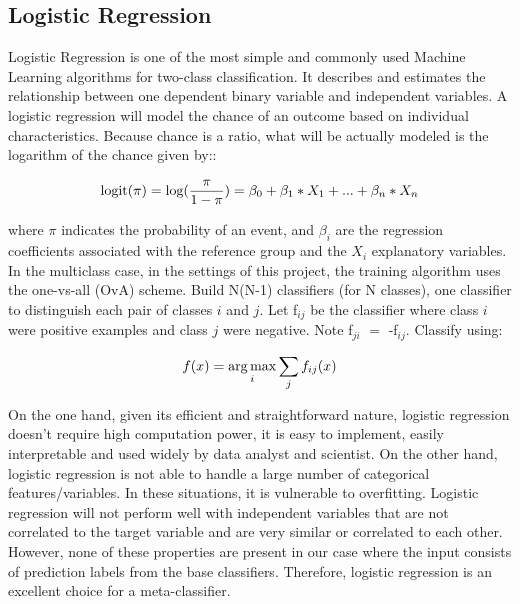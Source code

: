 \subsection{Logistic Regression}

Logistic Regression is one of the most simple and commonly used Machine Learning algorithms for two-class classification. It describes and estimates the relationship between one dependent binary variable and independent variables. A logistic regression will model the chance of an outcome based on individual characteristics. Because chance is a ratio, what will be actually modeled is the logarithm of the chance given by:: 

\begin{equation}
    \centering
    \text{logit($\pi$)} = \text{log}(\frac{\pi}{1 - \pi}) = \beta_0 + \beta_1 * X_1 + ... + \beta_n * X_n 
\end{equation} 

where $\pi$ indicates the probability of an event, and $\beta_i$ are the regression coefficients associated with the reference group and the $X_i$ explanatory variables. \\

In the multiclass case, in the settings of this project, the training algorithm uses the one-vs-all (OvA) scheme.
Build N(N-1) classifiers (for N classes), one classifier to distinguish each pair of classes $i$ and $j$. Let f$_{ij}$ be the classifier where class $i$ were positive examples and class $j$ were negative. Note f$_{ji}$ $=$ -f$_{ij}$. Classify using:

\begin{equation}
    \centering
    f(x) = \argmax_{i} \sum_{j} f_{ij}(x)
\end{equation} 

On the one hand, given its efficient and straightforward nature, logistic regression doesn't require high computation power, it is easy to implement, easily interpretable and used widely by data analyst and scientist. On the other hand, logistic regression is not able to handle a large number of categorical features/variables. In these situations, it is vulnerable to overfitting. Logistic regression will not perform well with independent variables that are not correlated to the target variable and are very similar or correlated to each other. However, none of these properties are present in our case where the input consists of prediction labels from the base classifiers. Therefore, logistic regression is an excellent choice for a meta-classifier. 

